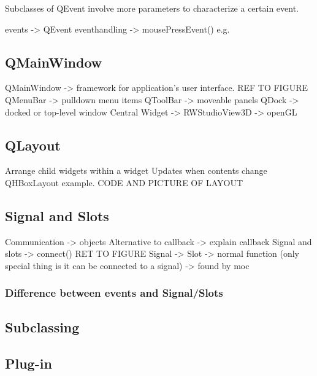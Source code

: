 Subclasses of QEvent involve more parameters to characterize a certain event.

events -> QEvent eventhandling -> mousePressEvent() e.g.

\subsection{QMainWindow}
QMainWindow -> framework for application's user interface. REF TO FIGURE
QMenuBar -> pulldown menu items
QToolBar -> moveable panels
QDock -> docked or top-level window
Central Widget -> RWStudioView3D -> openGL

\subsection{QLayout}
\label{sec:QLayout}
Arrange child widgets within a widget
Updates when contents change
QHBoxLayout example. CODE AND PICTURE OF LAYOUT

\subsection{Signal and Slots}
\label{sec:signalandslots}
Communication -> objects
Alternative to callback -> explain callback
Signal and slots -> connect() RET TO FIGURE
Signal -> 
Slot -> normal function (only special thing is it can be connected to a signal) -> found by moc
\subsubsection{Difference between events and Signal/Slots}


\subsection{Subclassing}

\subsection{Plug-in}

